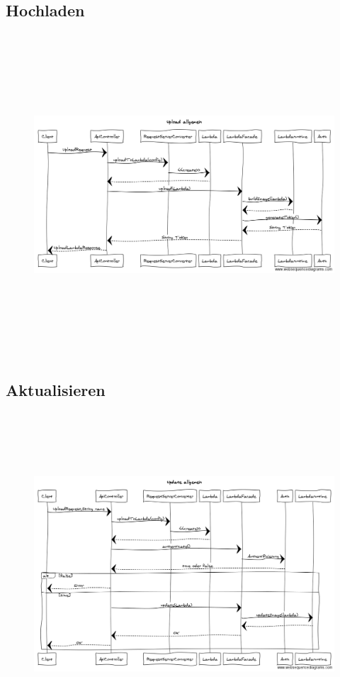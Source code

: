 \documentclass[a4paper,20pt,oneside]{book}
\begin{document}
	\subsection{Hochladen}
	\begin{figure}[!hb]
    \includegraphics[width=18cm,height=12cm]{Upload}
\end{figure}
\newpage
\subsection{Aktualisieren}
	\begin{figure}[!hb]
    \includegraphics[width=18cm,height=12cm]{Update}
\end{figure}
\newpage
\end{document}
